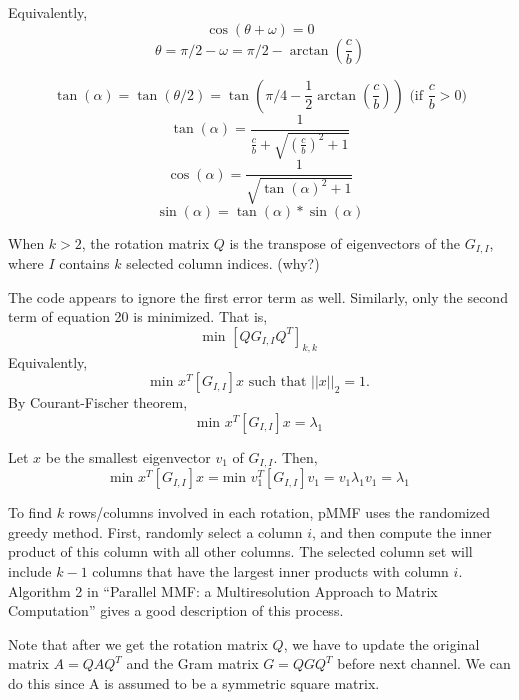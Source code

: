 \documentclass[a4paper]{article}
\begin{document}
 Equivalently,
 $$\cos(\theta + \omega) = 0$$
 $$\theta = \pi/2-\omega = \pi/2 - \arctan(\frac{c}{b})$$
 
$$\tan(\alpha) = \tan(\theta/2) = \tan(\pi/4 - \frac{1}{2}\arctan(\frac{c}{b})) \text{     (if }\frac{c}{b}>0)$$
$$\tan(\alpha) = \frac{1}{\frac{c}{b} + \sqrt{(\frac{c}{b})^2 +1}}$$
$$\cos(\alpha) = \frac{1}{\sqrt{\tan(\alpha)^2 + 1}}$$
$$\sin(\alpha) = \tan(\alpha)*\sin(\alpha)$$

When $k>2$, the rotation matrix $Q$ is the transpose of eigenvectors of the $G_{I,I}$, where $I$ contains $k$ selected column indices. (why?)

The code appears to ignore the first error term as well. Similarly, only the second term of equation 20 is minimized. That is,
$$\text{min } [QG_{I,I}Q^T]_{k,k}$$
Equivalently, $$\text{min } x^T[G_{I,I}]x \text{ such that } ||x||_2 = 1.$$
By Courant-Fischer theorem, $$\text{min } x^T[G_{I,I}]x = \lambda_1$$

Let $x$ be the smallest eigenvector $v_1$ of $G_{I,I}$. Then,
$$\text{min } x^T[G_{I,I}]x = \text{min } v_1^T[G_{I,I}]v_1 = v_1\lambda_1v_1 = \lambda_1$$


To find $k$ rows/columns involved in each rotation, pMMF uses the randomized greedy method. First, randomly select a column $i$, and then compute the inner product of this column with all other columns. The selected column set will include $k-1$ columns that have the largest inner products with column $i$. Algorithm 2 in ``Parallel MMF: a Multiresolution Approach to Matrix Computation'' gives a good description of this process.

Note that after we get the rotation matrix $Q$, we have to update the original matrix $A= QAQ^T$ and the Gram matrix $G = QGQ^T$ before next channel. We can do this since A is assumed to be a symmetric square matrix.
\end{document}
